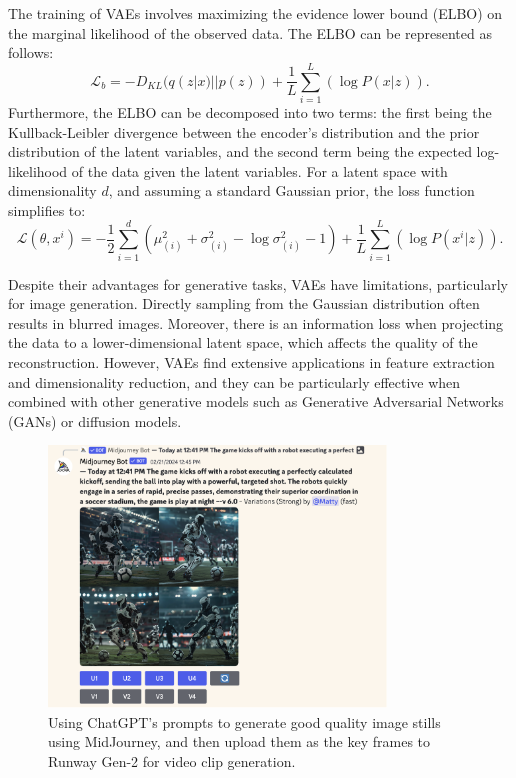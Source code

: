 \documentclass[11pt,a4paper,oneside]{report}
\begin{document}
The training of VAEs involves maximizing the evidence lower bound (ELBO) on the marginal likelihood of the observed data. The ELBO can be represented as follows:
\begin{equation}
\mathcal{L}_b = -D_{KL}(q(z|x)||p(z)) + \frac{1}{L} \sum_{i=1}^{L}(\log P(x|z)).
\end{equation}
Furthermore, the ELBO can be decomposed into two terms: the first being the Kullback-Leibler divergence between the encoder's distribution and the prior distribution of the latent variables, and the second term being the expected log-likelihood of the data given the latent variables. For a latent space with dimensionality $d$, and assuming a standard Gaussian prior, the loss function simplifies to:
\begin{equation}
\mathcal{L}(\theta, x^i) = -\frac{1}{2} \sum_{i=1}^{d} \left( \mu^{2}_{(i)} + \sigma^{2}_{(i)} - \log \sigma^{2}_{(i)} - 1 \right) + \frac{1}{L} \sum_{i=1}^{L} \left( \log P(x^{i} | z) \right).
\end{equation}

Despite their advantages for generative tasks, VAEs have limitations, particularly for image generation. Directly sampling from the Gaussian distribution often results in blurred images. Moreover, there is an information loss when projecting the data to a lower-dimensional latent space, which affects the quality of the reconstruction. However, VAEs find extensive applications in feature extraction and dimensionality reduction, and they can be particularly effective when combined with other generative models such as Generative Adversarial Networks (GANs) or diffusion models.

\begin{figure}[htbp]
  \centering
  \includegraphics[width=0.8\textwidth]{mj.png}
  \caption{Using ChatGPT's prompts to generate good quality image stills using MidJourney, and then upload them as the key frames to Runway Gen-2 for video clip generation.}
\end{figure}
\end{document}
